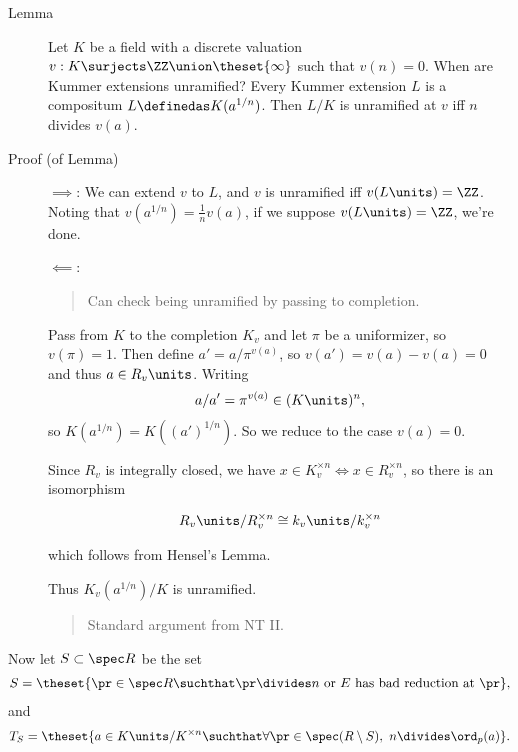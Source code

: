 \begin{description}
\item[Lemma]
Let \(K\) be a field with a discrete valuation
\(v: K \surjects \ZZ \union \theset{\infty}\) such that \(v(n) = 0\).
When are Kummer extensions unramified? Every Kummer extension \(L\) is a
compositum \(L \definedas K(a^{1/n})\). Then \(L/K\) is unramified at
\(v\) iff \(n\) divides \(v(a)\).
\item[Proof (of Lemma)]
\hfill

\(\implies\): We can extend \(v\) to \(L\), and \(v\) is unramified iff
\(v(L\units) = \ZZ\). Noting that \(v(a^{1/n}) = \frac 1 n v(a)\), if we
suppose \(v(L\units) = \ZZ\), we're done.

\(\impliedby\):

\begin{quote}
Can check being unramified by passing to completion.
\end{quote}

Pass from \(K\) to the completion \(K_v\) and let \(\pi\) be a
uniformizer, so \(v(\pi) = 1\). Then define \(a' = a/\pi^{v(a)}\), so
\(v(a') = v(a) - v(a) = 0\) and thus \(a \in R_v\units\). Writing
\begin{align*}
a/a' = \pi^{v(a)} \in (K\units)^n
,\end{align*} so \(K(a^{1/n}) = K((a')^{1/n})\). So we reduce to the
case \(v(a) = 0\).

Since \(R_v\) is integrally closed, we have
\(x\in K_v^{\times n} \iff x\in R_v^{\times n}\), so there is an
isomorphism

\begin{align*}
R_v\units / R_v^{\times n} \cong k_v\units / k_v^{\times n}
\end{align*}

which follows from Hensel's Lemma.

Thus \(K_v(a^{1/n})/K\) is unramified.

\begin{quote}
Standard argument from NT II.
\end{quote}
\end{description}

Now let \(S\subset \spec R\) be the set
\begin{align*}
S = \theset{\pr \in \spec R \suchthat \pr \divides n \text{ or } E  \text{ has bad reduction at } \pr }
,\end{align*} and
\begin{align*}
T_S =  \theset{ a\in K\units / K^{\times n} \suchthat \forall \pr\in \spec(R\setminus S),~ n \divides \ord_p(a)}
.\end{align*}

